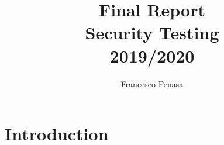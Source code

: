\documentclass[11pt]{article}
\begin{document}
\author{Francesco Penasa}
\title{Final Report \\Security Testing \\2019/2020}
\maketitle

\medskip

\section{Introduction}
\end{document}

